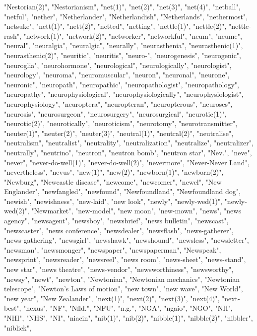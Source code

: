 "Nestorian(2)",
"Nestorianism",
"net(1)",
"net(2)",
"net(3)",
"net(4)",
"netball",
"netful",
"nether",
"Netherlander",
"Netherlandish",
"Netherlands",
"nethermost",
"netsuke",
"nett(1)",
"nett(2)",
"netted",
"netting",
"nettle(1)",
"nettle(2)",
"nettle-rash",
"network(1)",
"network(2)",
"networker",
"networkful",
"neum",
"neume",
"neural",
"neuralgia",
"neuralgic",
"neurally",
"neurasthenia",
"neurasthenic(1)",
"neurasthenic(2)",
"neuritic",
"neuritis",
"neuro-",
"neurogenesis",
"neurogenic",
"neuroglia",
"neurohormone",
"neurological",
"neurologically",
"neurologist",
"neurology",
"neuroma",
"neuromuscular",
"neuron",
"neuronal",
"neurone",
"neuronic",
"neuropath",
"neuropathic",
"neuropathologist",
"neuropathology",
"neuropathy",
"neurophysiological",
"neurophysiologically",
"neurophysiologist",
"neurophysiology",
"neuroptera",
"neuropteran",
"neuropterous",
"neuroses",
"neurosis",
"neurosurgeon",
"neurosurgery",
"neurosurgical",
"neurotic(1)",
"neurotic(2)",
"neurotically",
"neuroticism",
"neurotomy",
"neurotransmitter",
"neuter(1)",
"neuter(2)",
"neuter(3)",
"neutral(1)",
"neutral(2)",
"neutralise",
"neutralism",
"neutralist",
"neutrality",
"neutralization",
"neutralize",
"neutralizer",
"neutrally",
"neutrino",
"neutron",
"neutron bomb",
"neutron star",
"Nev.",
"neve",
"never",
"never-do-well(1)",
"never-do-well(2)",
"nevermore",
"Never-Never Land",
"nevertheless",
"nevus",
"new(1)",
"new(2)",
"newborn(1)",
"newborn(2)",
"Newburg",
"Newcastle disease",
"newcome",
"newcomer",
"newel",
"New Englander",
"newfangled",
"newfound",
"Newfoundland",
"Newfoundland dog",
"newish",
"newishness",
"new-laid",
"new look",
"newly",
"newly-wed(1)",
"newly-wed(2)",
"Newmarket",
"new-model",
"new moon",
"new-mown",
"news",
"news agency",
"newsagent",
"newsboy",
"newsbrief",
"news bulletin",
"newscast",
"newscaster",
"news conference",
"newsdealer",
"newsflash",
"news-gatherer",
"news-gathering",
"newsgirl",
"newshawk",
"newshound",
"newsless",
"newsletter",
"newsman",
"newsmonger",
"newspaper",
"newspaperman",
"Newspeak",
"newsprint",
"newsreader",
"newsreel",
"news room",
"news-sheet",
"news-stand",
"new star",
"news theatre",
"news-vendor",
"newsworthiness",
"newsworthy",
"newsy",
"newt",
"newton",
"Newtonian",
"Newtonian mechanics",
"Newtonian telescope",
"Newton's Laws of motion",
"new town",
"new wave",
"New World",
"new year",
"New Zealander",
"next(1)",
"next(2)",
"next(3)",
"next(4)",
"next-best",
"nexus",
"NF",
"Nfld.",
"NFU",
"n.g.",
"NGA",
"ngaio",
"NGO",
"NH",
"NHI",
"NHS",
"NI",
"niacin",
"nib(1)",
"nib(2)",
"nibble(1)",
"nibble(2)",
"nibbler",
"niblick",
